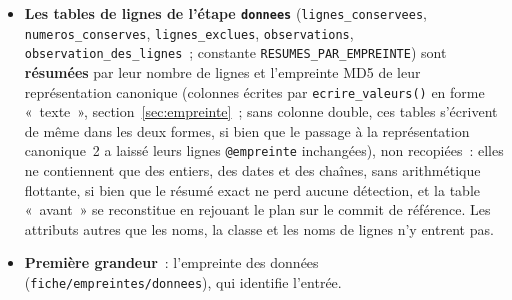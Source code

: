 \documentclass[a4paper,11pt]{article}
\newcommand{\code}[1]{\texttt{\small #1}}
\begin{document}
\begin{itemize}[leftmargin=*, itemsep=2pt]
    format reste \code{tablexp reference 1}~: le jeton est une chaîne valide,
    sans grammaire nouvelle.
  \item \sloppy \textbf{Les tables de lignes de l'étape \code{donnees}}
    (\code{lignes\_conservees}, \code{numeros\_conserves},
    \code{lignes\_exclues}, \code{observations},
    \code{observation\_des\_lignes}~; constante
    \code{RESUMES\_PAR\_EMPREINTE}) sont \textbf{résumées} par leur nombre de
    lignes et l'empreinte MD5 de leur représentation canonique (colonnes
    écrites par \code{ecrire\_valeurs()} en forme «~texte~»,
    section~\ref{sec:empreinte}~; sans colonne double, ces tables s'écrivent
    de même dans les deux formes, si bien que le passage à la représentation
    canonique~2 a laissé leurs lignes \code{@empreinte} inchangées),
    non recopiées~: elles ne contiennent que des entiers, des dates et des
    chaînes, sans arithmétique flottante, si bien que le résumé exact ne perd
    aucune détection, et la table «~avant~» se reconstitue en rejouant le plan
    sur le commit de référence. Les attributs autres que les noms, la classe
    et les noms de lignes n'y entrent pas.
  \item \textbf{Première grandeur}~: l'empreinte des données
    (\code{fiche/empreintes/donnees}), qui identifie l'entrée.
\end{itemize}
\end{document}

